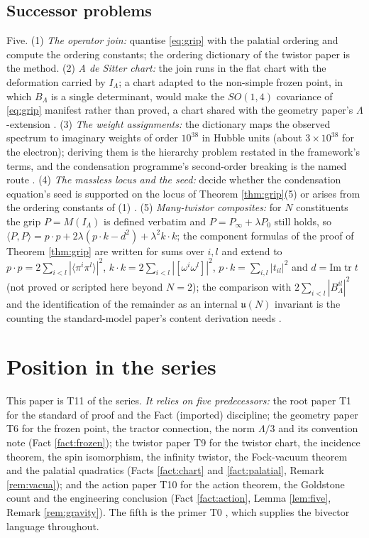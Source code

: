 \documentclass[11pt]{article}
\theoremstyle{definition}
\newcommand{\tr}{\operatorname{tr}}
\newcommand{\ip}[2]{\langle #1, #2\rangle}
\newcommand{\br}[1]{\langle #1\rangle}
\begin{document}
\subsection*{Successor problems}

Five. (1) \emph{The operator join:} quantise \eqref{eq:grip} with the palatial ordering and compute the ordering constants; the ordering dictionary of the twistor paper is the method. (2) \emph{A de Sitter chart:} the join runs in the flat chart with the deformation carried by $I_{\Lambda}$; a chart adapted to the non-simple frozen point, in which $B_{\Lambda}$ is a single determinant, would make the $SO(1,4)$ covariance of \eqref{eq:grip} manifest rather than proved, a chart shared with the geometry paper's $\Lambda$-extension \cite{ButlerT6}. (3) \emph{The weight assignments:} the dictionary maps the observed spectrum to imaginary weights of order $10^{38}$ in Hubble units (about $3 \times 10^{38}$ for the electron); deriving them is the hierarchy problem restated in the framework's terms, and the condensation programme's second-order breaking is the named route \cite{ButlerT13}. (4) \emph{The massless locus and the seed:} decide whether the condensation equation's seed is supported on the locus of Theorem \ref{thm:grip}(5) or arises from the ordering constants of (1) \cite{ButlerT13}. (5) \emph{Many-twistor composites:} for $N$ constituents the grip $P = M(I_{\Lambda})$ is defined verbatim and $P = P_{\infty} + \lambda P_{0}$ still holds, so $\ip{P}{P} = p\cdot p + 2\lambda(p\cdot k - d^{2}) + \lambda^{2}k\cdot k$; the component formulas of the proof of Theorem \ref{thm:grip} are written for sums over $i, l$ and extend to $p\cdot p = 2\sum_{i<l}|\br{\pi^{i}\pi^{l}}|^{2}$, $k\cdot k = 2\sum_{i<l}|[\omega^{i}\omega^{l}]|^{2}$, $p\cdot k = \sum_{i,l}|t_{il}|^{2}$ and $d = \mathrm{Im}\tr t$ (not proved or scripted here beyond $N = 2$); the comparison with $2\sum_{i<l}|B^{il}_{\Lambda}|^{2}$ and the identification of the remainder as an internal $\mathfrak{u}(N)$ invariant is the counting the standard-model paper's content derivation needs \cite{ButlerT12}.

\section{Position in the series}\label{sec:position}

This paper is T11 of the series. \emph{It relies on five predecessors:} the root paper T1 \cite{ButlerT1} for the standard of proof and the Fact (imported) discipline; the geometry paper T6 \cite{ButlerT6} for the frozen point, the tractor connection, the norm $\Lambda/3$ and its convention note (Fact \ref{fact:frozen}); the twistor paper T9 \cite{ButlerT9} for the twistor chart, the incidence theorem, the spin isomorphism, the infinity twistor, the Fock-vacuum theorem and the palatial quadratics (Facts \ref{fact:chart} and \ref{fact:palatial}, Remark \ref{rem:vacua}); and the action paper T10 \cite{ButlerT10} for the action theorem, the Goldstone count and the engineering conclusion (Fact \ref{fact:action}, Lemma \ref{lem:five}, Remark \ref{rem:gravity}). The fifth is the primer T0 \cite{ButlerT0}, which supplies the bivector language throughout.
\end{document}
